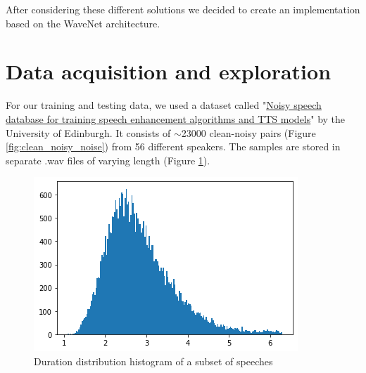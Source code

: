 \documentclass{article}
\begin{document}
	After considering these different solutions we decided to create an implementation based on the WaveNet architecture.
		
	\section{Data acquisition and exploration}
	For our training and testing data, we used a dataset called "\href{https://datashare.is.ed.ac.uk/handle/10283/2791}{Noisy speech database for training speech enhancement algorithms and TTS models}"\cite{dataset} by the University of Edinburgh. It consists of $\sim$23000 clean-noisy pairs (Figure \ref{fig:clean_noisy_noise}) from 56 different speakers. 
	The samples are stored in separate .wav files of varying length (Figure \ref{fig:dur}).  

	\begin{figure}[H]
		\centering
		\includegraphics[width=.5\linewidth]{durations}
		\caption{Duration distribution histogram of a subset of speeches}
		\label{fig:dur}
	\end{figure}
\end{document}
